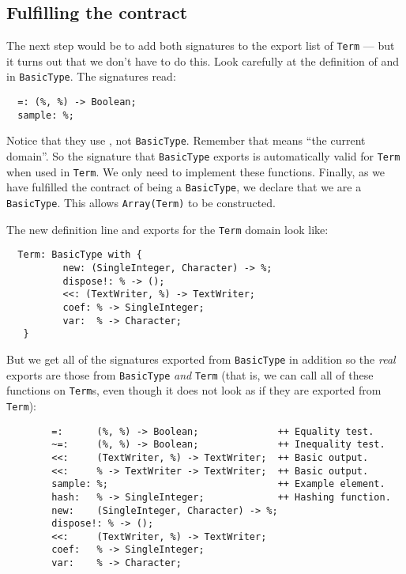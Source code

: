 \subsection{Fulfilling the contract}

The next step would be to add both signatures to the
export list of \verb"Term" --- but it turns out
that we don't have to do this. Look carefully at the definition of \ttin{=}
and  in \verb"BasicType". The signatures read:

\begin{small}
\begin{verbatim}
  =: (%, %) -> Boolean;
  sample: %;
\end{verbatim}
\end{small}

Notice that they use \ttin{\%}, not \verb"BasicType". Remember that \ttin{\%} means 
``the current domain''. So the signature that \verb"BasicType" exports is 
automatically valid for \verb"Term" when used in \verb"Term". We only need to 
implement these functions. Finally, as we have fulfilled the contract 
of being a \verb"BasicType", we declare that we are a \verb"BasicType". 
This allows \verb"Array(Term)" to be constructed.

The new definition line and exports for the \verb"Term" domain look like:

\begin{small}
\begin{verbatim}
  Term: BasicType with {
          new: (SingleInteger, Character) -> %;
          dispose!: % -> ();
          <<: (TextWriter, %) -> TextWriter;
          coef: % -> SingleInteger;
          var:  % -> Character;
   }
\end{verbatim}
\end{small}

But we get all of the signatures exported from \verb"BasicType" 
in addition so 
the {\em real} exports are those from \verb"BasicType" {\em and} \verb"Term" (that is, we 
can call all of these functions on \verb"Term"s, even though it does not
look as if they are exported from \verb"Term"):

\begin{small}
\begin{verbatim}
        =:      (%, %) -> Boolean;              ++ Equality test.
        ~=:     (%, %) -> Boolean;              ++ Inequality test.
        <<:     (TextWriter, %) -> TextWriter;  ++ Basic output.
        <<:     % -> TextWriter -> TextWriter;  ++ Basic output.
        sample: %;                              ++ Example element.
        hash:   % -> SingleInteger;             ++ Hashing function.
        new:    (SingleInteger, Character) -> %;
        dispose!: % -> ();
        <<:     (TextWriter, %) -> TextWriter;
        coef:   % -> SingleInteger;
        var:    % -> Character;
\end{verbatim}
\end{small}

